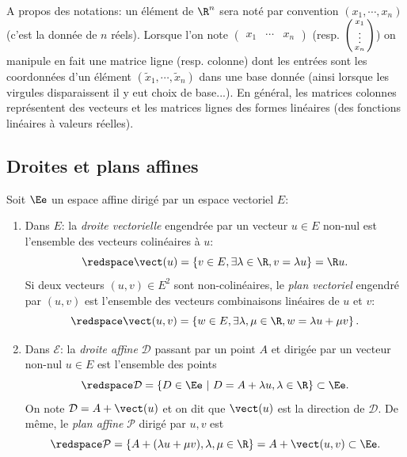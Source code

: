 \sld{\vfill\pagebreak[5]}%


\begin{remark}
A propos des notations: un élément de $\R^n$ sera noté par convention $(x_1,\cdots, x_n)$ (c'est la donnée de $n$ réels). Lorsque l'on note $\begin{pmatrix}x_1 & \cdots & x_n\end{pmatrix}$  (resp. $\begin{psmallmatrix}x_1 \\ \vdots \\ x_n\end{psmallmatrix}$) on manipule en fait une matrice ligne (resp. colonne) dont les entrées sont les coordonnées d'un élément $(\tilde x_1, \cdots, \tilde x_n)$ dans une base donnée (ainsi lorsque les virgules disparaissent il y eut choix de base...). En général, les matrices colonnes représentent des vecteurs et les matrices lignes des formes linéaires (des fonctions linéaires à valeurs réelles).
\end{remark}
\sld{\vfill\pagebreak[5]}%
\subsection{Droites et plans affines}

\begin{definition}%
Soit $\Ee$ un espace affine dirigé par un espace vectoriel $E$: 
	\begin{enumerate}
		\item Dans $E$: la \emph{droite vectorielle} engendrée par un vecteur $u\in E$ non-nul est l'ensemble des vecteurs colinéaires à $u$:
			\[
\redspace
				\vect(u) = \left\{ v\in E, \exists \lambda \in \R, v = \lambda u \right\} = \R u.
			\]
\pl{\rep{3cm}}
Si deux vecteurs $(u,v) \in E^2$ sont non-colinéaires, le \emph{plan vectoriel} engendré par $(u,v)$ est l'ensemble des vecteurs combinaisons linéaires de $u$ et $v$:
			\[
\redspace
				\vect(u,v) = \left\{ w\in E, \exists \lambda,\mu \in \R, w = \lambda u + \mu v \right\}.
			\]
\pl{\rep{3cm}}
		\item	Dans $\mathcal E$: la \emph{droite affine} $\mathcal D$ passant par un point $A$ et dirigée par un vecteur non-nul $u\in E$ est l'ensemble des points 
			\[
\redspace
			\mathcal D = \left\{D\in\Ee\  | \  D = A + \lambda u, \lambda \in \R \right\} \subset \Ee.
		\]
		On note $\mathcal D = A + \vect (u)$ et on dit que $\vect(u)$ est la direction de $\mathcal D$. De même, le \emph{plan affine} $\mathcal P$ dirigé par $u,v$ est 
		\[
\redspace
			\mathcal P =\left\{ A  + (\lambda u + \mu v), \lambda,\mu \in \R \right\} = A + \vect(u,v) \subset \Ee.
		\]
\pl{\rep{3cm}}
	\end{enumerate}
\end{definition}

